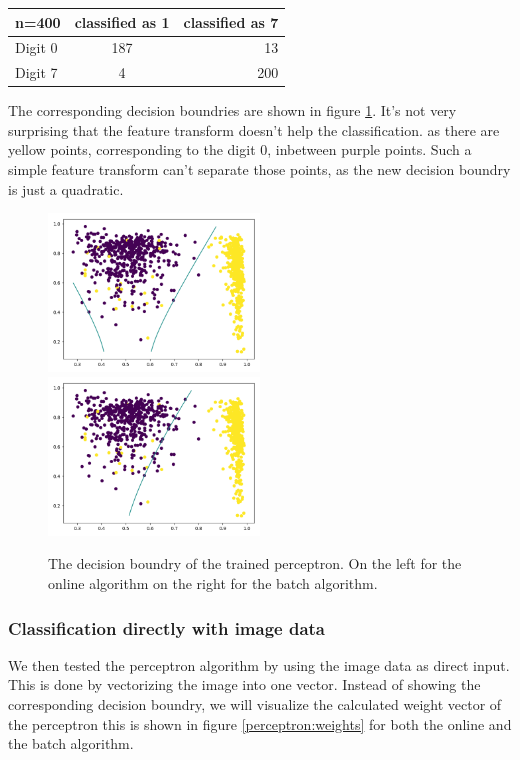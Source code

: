 \begin{tabular}{ l | c | r }
\centering
  n=400 & classified as 1 & classified as 7 \\ \hline
  Digit 0 & 187 & 13 \\
  Digit 7 & 4 & 200 \\
\end{tabular}

The corresponding decision boundries are shown in figure \ref{perceptron:decision:5d}. It's not very surprising that the feature transform doesn't help the classification. as there are yellow points, corresponding to the digit 0, inbetween purple points. Such a simple feature transform can't separate those points, as the new decision boundry is just a quadratic.

\begin{figure}
\includegraphics[width = 0.5\textwidth]{figures/decision_5d_online}
\includegraphics[width = 0.5\textwidth]{figures/decision_5d_batch}
\caption{The decision boundry of the trained perceptron. On the left for the online algorithm on the right for the batch algorithm.}
\label{perceptron:decision:5d}
\end{figure}

\subsubsection{Classification directly with image data}
We then tested the perceptron algorithm by using the image data as direct input. This is done by vectorizing the image into one vector. Instead of showing the corresponding decision boundry, we will visualize the calculated weight vector of the perceptron this is shown in figure \ref{perceptron:weights} for both the online and the batch algorithm.


